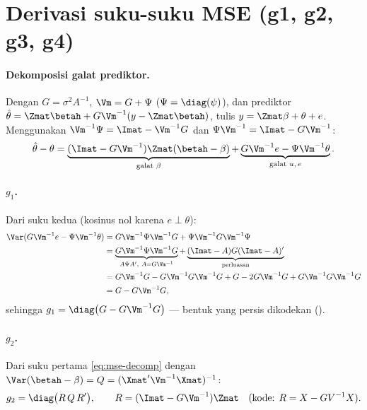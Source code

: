 \section{Derivasi suku-suku MSE (g1, g2, g3, g4)}\label{app:g}

\paragraph{Dekomposisi galat prediktor.} Dengan $G=\sigma^2A^{-1}$,
$\Vm=G+\Psi$ ($\Psi=\diag(\psi)$), dan prediktor
$\hat\theta=\Zmat\betah+G\Vm^{-1}(y-\Zmat\betah)$, tulis
$y=\Zmat\beta+\theta+e$. Menggunakan $\Vm^{-1}\Psi=\Imat-\Vm^{-1}G$ dan
$\Psi\Vm^{-1}=\Imat-G\Vm^{-1}$:
\begin{equation}
  \hat\theta-\theta
  =\underbrace{(\Imat-G\Vm^{-1})\Zmat(\betah-\beta)}_{\text{galat }\beta}
   +\underbrace{G\Vm^{-1}e-\Psi\Vm^{-1}\theta}_{\text{galat }u,\,e}.
  \label{eq:mse-decomp}
\end{equation}
\paragraph{$g_1$.} Dari suku kedua (kosinus nol karena $e\perp\theta$):
\begin{align}
  \Var(G\Vm^{-1}e-\Psi\Vm^{-1}\theta)
  &=G\Vm^{-1}\Psi\Vm^{-1}G+\Psi\Vm^{-1}G\Vm^{-1}\Psi\notag\\
  &=\underbrace{G\Vm^{-1}\Psi\Vm^{-1}G}_{A\Psi A',\ A=G\Vm^{-1}}
    +\underbrace{(\Imat-A)G(\Imat-A)'}_{\text{perluasan}}\notag\\
  &=G\Vm^{-1}G-G\Vm^{-1}G\Vm^{-1}G+G-2G\Vm^{-1}G+G\Vm^{-1}G\Vm^{-1}G\notag\\
  &=G-G\Vm^{-1}G,
  \label{eq:g1-deriv}
\end{align}
sehingga $g_1=\diag\bigl(G-G\Vm^{-1}G\bigr)$ --- bentuk yang persis
dikodekan ().

\paragraph{$g_2$.} Dari suku pertama \eqref{eq:mse-decomp} dengan
$\Var(\betah-\beta)=Q=(\Xmat'\Vm^{-1}\Xmat)^{-1}$:
\begin{equation}
  g_2=\diag\bigl(R\,Q\,R'\bigr),\qquad R=(\Imat-G\Vm^{-1})\Zmat
  \quad(\text{kode: }R=X-GV^{-1}X).
  \label{eq:g2-deriv}
\end{equation}

